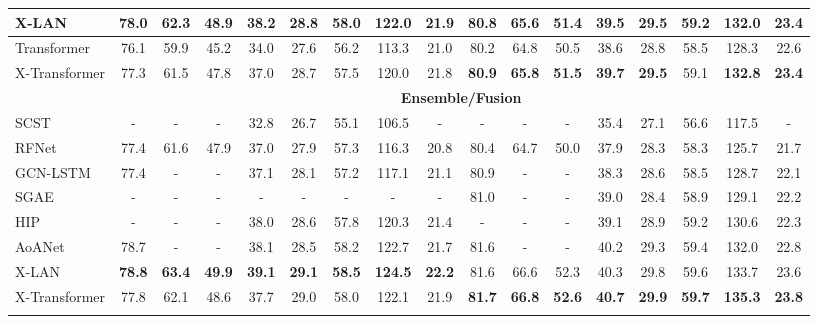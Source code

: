 \documentclass[10pt,twocolumn,letterpaper]{article}
\begin{document}
\begin{table*}[t]
\begin{tabular}{l | c c c c c c c c | c c c c c c c c}
      \hline
X-LAN                         & \textbf{78.0} & \textbf{62.3} & \textbf{48.9} & \textbf{38.2} & \textbf{28.8} & \textbf{58.0} & \textbf{122.0} & \textbf{21.9} & 80.8 & 65.6 & 51.4 & 39.5 & \textbf{29.5} & \textbf{59.2} & 132.0 & \textbf{23.4} \\
      \hline
Transformer \cite{sharma2018conceptual}   & 76.1 & 59.9 & 45.2 & 34.0 & 27.6 & 56.2 & 113.3 & 21.0 & 80.2 & 64.8 & 50.5 & 38.6 & 28.8 & 58.5 & 128.3 & 22.6 \\
X-Transformer                         & 77.3 & 61.5 & 47.8 & 37.0 & 28.7 & 57.5 & 120.0 & 21.8 & \textbf{80.9} & \textbf{65.8} & \textbf{51.5} & \textbf{39.7} & \textbf{29.5} & 59.1 & \textbf{132.8} & \textbf{23.4} \\\hline
			& \multicolumn{16}{c}{\textbf{Ensemble/Fusion}} \\ \hline
SCST \cite{rennie2017self} & -   &   -  &   -  & 32.8 & 26.7 & 55.1 & 106.5 &   -  &  -   &  -   &  -   & 35.4 & 27.1 & 56.6 & 117.5 &  -   \\
RFNet \cite{jiang2018recurrent} & 77.4 & 61.6 & 47.9 & 37.0 & 27.9 & 57.3 & 116.3 & 20.8 & 80.4 & 64.7 & 50.0 & 37.9 & 28.3 & 58.3 & 125.7 & 21.7 \\
GCN-LSTM \cite{yao2018exploring}& 77.4 & - & - & 37.1 & 28.1 & 57.2 & 117.1 & 21.1 & 80.9 &  -   &  -   & 38.3 & 28.6 & 58.5 & 128.7 & 22.1 \\
SGAE \cite{Yang:CVPR19}   &  -   &   -  &   -  &  -   &   -  &   -  &   -   &   -  & 81.0 &  -   &  -   & 39.0 & 28.4 & 58.9 & 129.1 & 22.2 \\
HIP \cite{yao2019hierarchy} & -   &   -  &   - &  {38.0}  &  {28.6}  &  {57.8}  &  {120.3} & {21.4} & -   &   -  &   -  &  {39.1}  &  {28.9}  &  {59.2}  & {130.6}   & {22.3} \\
AoANet \cite{huang2019attentio} & 78.7 & - & - & 38.1 & 28.5 & 58.2 & 122.7 & 21.7 & 81.6 &  -   &  -   & 40.2 & 29.3 & 59.4 & 132.0 & 22.8 \\\hline
X-LAN & \textbf{78.8} & \textbf{63.4} & \textbf{49.9} & \textbf{39.1} & \textbf{29.1} & \textbf{58.5} & \textbf{124.5} & \textbf{22.2} & 81.6 & 66.6 & 52.3 & 40.3 & 29.8 & 59.6 & 133.7 & 23.6 \\\hline
X-Transformer & 77.8 & 62.1 & 48.6 & 37.7 & 29.0 & 58.0 & 122.1 & 21.9 & \textbf{81.7} & \textbf{66.8} & \textbf{52.6} & \textbf{40.7} & \textbf{29.9} & \textbf{59.7} & \textbf{135.3} & \textbf{23.8} \\

		\Xhline{2\arrayrulewidth}
    \end{tabular}
	\vspace{-0.2in}
    \label{tab:COCO}
\end{table*}
\end{document}
